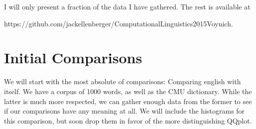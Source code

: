 \documentclass{article}
\begin{document}
I will only present a fraction of the data I have gathered. The rest is available at

 https://github.com/jackellenberger/ComputationalLinguistics2015Voynich.



\section{Initial Comparisons}
	We will start with the most absolute of comparisons: Comparing english with itself. We have a corpus of 1000 words, as well as the CMU dictionary. While the latter is much more respected, we can gather enough data from the former to see if our comparisons have any meaning at all. We will include the histograms for this comparison, but soon drop them in favor of the more distinguishing QQplot.
	
\end{document}
